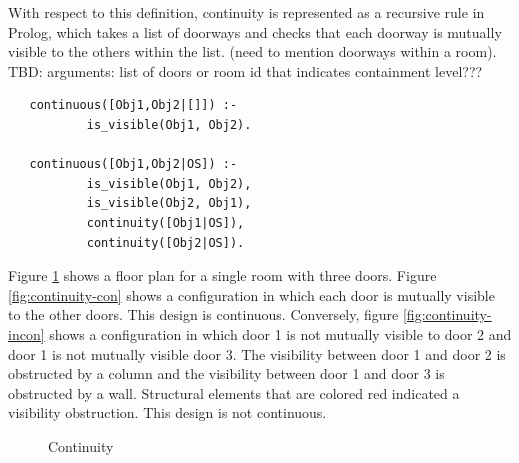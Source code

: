 \documentclass[12pt]{ucthesis}
\begin{document}
With respect to this definition, continuity is represented as a recursive rule in Prolog, which takes a list of doorways and checks that each doorway is mutually visible to the others within the list. (need to mention doorways within a room). TBD: arguments: list of doors or room id that indicates containment level???

\begin{verbatim}
   continuous([Obj1,Obj2|[]]) :- 
           is_visible(Obj1, Obj2).

   continuous([Obj1,Obj2|OS]) :- 
           is_visible(Obj1, Obj2),
	       is_visible(Obj2, Obj1),
           continuity([Obj1|OS]),
           continuity([Obj2|OS]).
\end{verbatim}

Figure \ref{continuity} shows a floor plan for a single room with three doors. Figure \ref{fig:continuity-con} shows a configuration in which each door is mutually visible to the other doors. This design is continuous. Conversely, figure \ref{fig:continuity-incon} shows a configuration in which door 1 is not mutually visible to door 2 and door 1 is not mutually visible door 3. The visibility between door 1 and door 2 is obstructed by a column and the visibility between door 1 and door 3 is obstructed by a wall. Structural elements that are colored red indicated a visibility obstruction. This design is not continuous. 

\begin{figure}[H]
 \centering
  \hspace{30 mm}
 \caption{Continuity}
\label{continuity}
\end{figure}
\end{document}
